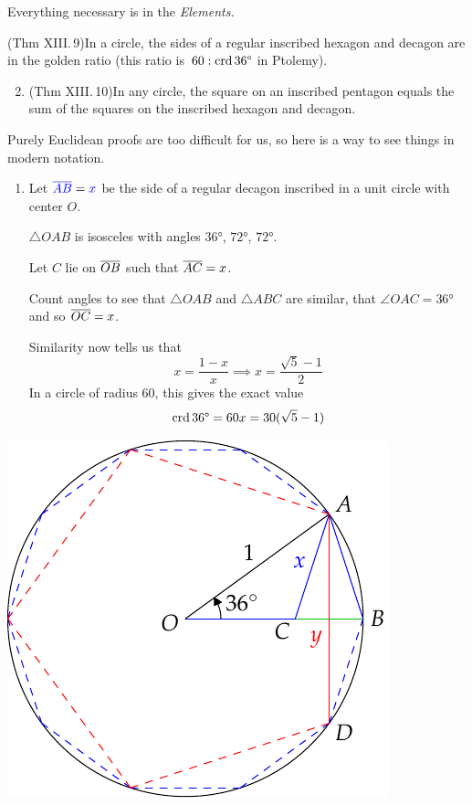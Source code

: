 
Everything necessary is in the \emph{Elements.}

\begin{thm*}{}{}
	\exstart (Thm XIII.\,9)\lstsp In a circle, the sides of a regular inscribed hexagon and decagon are in the golden ratio (this ratio is\ $60:\crd \ang{36}$ in Ptolemy).
	\begin{enumerate}\setcounter{enumi}{1}
	  \item (Thm XIII.\,10)\lstsp In any circle, the square on an inscribed pentagon equals the sum of the squares on the inscribed hexagon and decagon.
	\end{enumerate}
\end{thm*}

Purely Euclidean proofs are too difficult for us, so here is a way to see things in modern notation.

\begin{minipage}[t]{0.55\linewidth}\vspace{0pt}
	\begin{enumerate}
	  \item Let $\textcolor{blue}{\cl{AB}}=\textcolor{blue}{x}$ be the side of a regular decagon inscribed in a unit circle with center $O$.\par
	  $\triangle OAB$ is isosceles with angles $\ang{36}$, $\ang{72}$, $\ang{72}$.\par
		Let $C$ lie on $\cl{OB}$ such that $\cl{AC}=x$.\par
		Count angles to see that $\triangle OAB$ and $\triangle ABC$ are similar, that $\angle OAC=\ang{36}$ and so $\cl{OC}=x$.\par
		Similarity now tells us that
		\[
			x=\frac{1-x}x\implies x=\dfrac{\sqrt 5-1}2
		\]
		In a circle of radius 60, this gives the exact value
	  \[
	  	\crd \ang{36}=60x=30(\sqrt 5-1)
	  \]
	  \end{enumerate}
\end{minipage}
\hfill
\begin{minipage}[t]{0.44\linewidth}\vspace{0pt}
	\flushright\includegraphics[scale=0.95]{pentagon}
\end{minipage}

